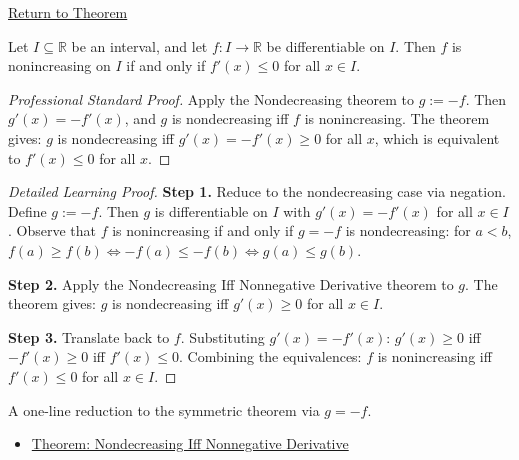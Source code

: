 \newpage
{}
\label{prf:nonincreasing-iff-nonpos-derivative}

\begin{remark*}[Return]
\hyperref[thm:nonincreasing-iff-nonpos-derivative]{Return to Theorem}
\end{remark*}

\begin{theorem*}
Let $I \subseteq \mathbb{R}$ be an interval, and let $f : I \to \mathbb{R}$ be differentiable on $I$. Then $f$ is nonincreasing on $I$ if and only if $f'(x) \leq 0$ for all $x \in I$.
\end{theorem*}

\begin{proof}[Professional Standard Proof]
\LRAProofBodyStart
Apply the Nondecreasing theorem to $g := -f$. Then $g'(x) = -f'(x)$, and $g$ is nondecreasing iff $f$ is nonincreasing. The theorem gives: $g$ is nondecreasing iff $g'(x) = -f'(x) \geq 0$ for all $x$, which is equivalent to $f'(x) \leq 0$ for all $x$.
\end{proof}

\begin{proof}[Detailed Learning Proof]
\LRAProofBodyStart

\textbf{Step 1.} Reduce to the nondecreasing case via negation. Define $g := -f$. Then $g$ is differentiable on $I$ with $g'(x) = -f'(x)$ for all $x \in I$. Observe that $f$ is nonincreasing if and only if $g = -f$ is nondecreasing: for $a < b$, $f(a) \geq f(b) \iff -f(a) \leq -f(b) \iff g(a) \leq g(b)$.

\textbf{Step 2.} Apply the Nondecreasing Iff Nonneg\-ative Derivative theorem to $g$. The theorem gives: $g$ is nondecreasing iff $g'(x) \geq 0$ for all $x \in I$.

\textbf{Step 3.} Translate back to $f$. Substituting $g'(x) = -f'(x)$: $g'(x) \geq 0$ iff $-f'(x) \geq 0$ iff $f'(x) \leq 0$. Combining the equivalences: $f$ is nonincreasing iff $f'(x) \leq 0$ for all $x \in I$.
\end{proof}

\begin{remark*}
A one-line reduction to the symmetric theorem via $g = -f$.
\end{remark*}

\begin{dependencies}
\begin{itemize}
  \item \hyperref[thm:nondecreasing-iff-nonneg-derivative]{Theorem: Nondecreasing Iff Nonneg\-ative Derivative}
\end{itemize}
\end{dependencies}

\clearpage
